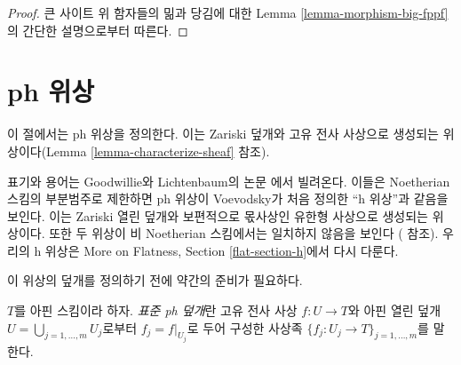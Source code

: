 \begin{proof}
큰 사이트 위 함자들의 밂과 당김에 대한 Lemma
\ref{lemma-morphism-big-fppf}의 간단한 설명으로부터 따른다.
\end{proof}



















































\section{ph 위상}
\label{section-ph}

\noindent
이 절에서는 ph 위상을 정의한다. 이는 Zariski 덮개와 고유 전사 사상으로
생성되는 위상이다(Lemma \ref{lemma-characterize-sheaf} 참조).

\medskip\noindent
표기와 용어는 Goodwillie와 Lichtenbaum의 논문 \cite{ph}에서 빌려온다.
이들은 Noetherian 스킴의 부분범주로 제한하면 ph 위상이 Voevodsky가
처음 정의한 ``h 위상''과 같음을 보인다. 이는 Zariski 열린 덮개와
보편적으로 몫사상인 유한형 사상으로 생성되는 위상이다. 또한 두 위상이
비 Noetherian 스킴에서는 일치하지 않음을 보인다
(\cite[Example 4.5]{ph} 참조). 우리의 h 위상은 More on Flatness,
Section \ref{flat-section-h}에서 다시 다룬다.

\medskip\noindent
이 위상의 덮개를 정의하기 전에 약간의 준비가 필요하다.

\begin{definition}
\label{definition-standard-ph-covering}
$T$를 아핀 스킴이라 하자. {\it 표준 ph 덮개}란 고유 전사 사상
$f : U \to T$와 아핀 열린 덮개
$U = \bigcup_{j = 1, \ldots, m} U_j$로부터 $f_j = f|_{U_j}$로 두어
구성한 사상족 $\{f_j : U_j \to T\}_{j = 1, \ldots, m}$를 말한다.
\end{definition}

